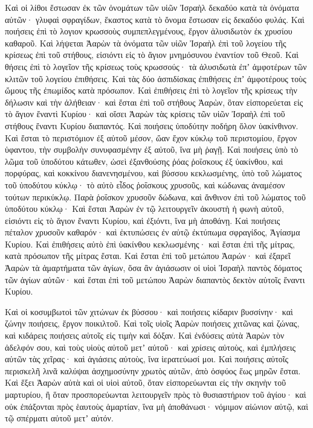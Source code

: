 {Καὶ οἱ λίθοι ἔστωσαν ἐκ τῶν ὀνομάτων τῶν υἱῶν Ἰσραὴλ δεκαδύο κατὰ τὰ ὀνόματα αὐτῶν· γλυφαὶ σφραγίδων, ἕκαστος κατὰ τὸ ὄνομα ἔστωσαν εἰς δεκαδύο φυλάς.
Καὶ ποιήσεις ἐπὶ τὸ λογιον κρωσσοὺς συμπεπλεγμένους, ἔργον ἁλυσιδωτὸν ἐκ χρυσίου καθαροῦ.
Καὶ λήψεται Ἀαρὼν τὰ ὀνόματα τῶν υἱῶν Ἰσραὴλ ἐπὶ τοῦ λογείου τῆς κρίσεως ἐπὶ τοῦ στήθους, εἰσιόντι εἰς τὸ ἅγιον μνημόσυνου ἐναντίον τοῦ Θεοῦ.
Καὶ θήσεις ἐπὶ τὸ λογεῖον τῆς κρίσεως τοὺς κρωσσούς· τὰ ἁλυσιδωτὰ ἐπʼ ἀμφοτέρων τῶν κλιτῶν τοῦ λογείου ἐπιθήσεις. Καὶ τὰς δύο ἀσπιδίσκας ἐπιθήσεις ἐπʼ ἀμφοτέρους τοὺς ὤμους τῆς ἐπωμίδος κατὰ πρόσωπον.
Καὶ ἐπιθήσεις ἐπὶ τὸ λογεῖον τῆς κρίσεως τὴν δήλωσιν καὶ τὴν ἀλήθειαν· καὶ ἔσται ἐπὶ τοῦ στήθους Ἀαρὼν, ὃταν εἰσπορεύεται εἰς τὸ ἅγιον ἔναντὶ Κυρίου· καὶ οἴσει Ἀαρὼν τὰς κρίσεις τῶν υἱῶν Ἰσραὴλ ἐπὶ τοῦ στήθους ἔναντι Κυρίου διαπαντός.
Καὶ ποιήσεις ὑποδύτην ποδήρη ὅλον ὑακίνθινον.
Καὶ ἔσται τὸ περιστόμιον ἐξ αὐτοῦ μέσον, ὤαν ἔχον κύκλῳ τοῦ περιστομίου, ἔργον ὑφαντου, τὴν συμβολὴν συνυφασμένην ἐξ αὐτοῦ, ἵνα μὴ ῥαγῇ.
Καὶ ποιήσεις ὑπὸ τὸ λῶμα τοῦ ὑποδύτου κάτωθεν, ὡσεὶ ἐξανθούσης ῥόας ῥοΐσκους ἐξ ὑακίνθου, καὶ πορφύρας, καὶ κοκκίνου διανενησμένου, καὶ βύσσου κεκλωσμένης, ὑπὸ τοῦ λώματος τοῦ ὑποδύτου κύκλῳ· τὸ αὐτὸ εἶδος ῥοΐσκους χρυσοῦς, καὶ κώδωνας ἀναμέσον τούτων περικύκλῳ.
Παρὰ ῥοΐσκον χρυσοῦν δώδωνα, καὶ ἄνθινον ἐπὶ τοῦ λώματος τοῦ ὑποδύτου κύκλῳ·
Καὶ ἔσται Ἀαρὼν ἐν τῷ λειτουργεῖν ἀκουστὴ ἡ φωνὴ αὐτοῦ, εἰσιόντι εἰς τὸ ἅγιον ἔναντι Κυρίου, καὶ ἐξιόντι, ἵνα μὴ ἀποθάνῃ.
Καὶ ποιήσεις πέταλον χρυσοῦν καθαρόν· καὶ ἐκτυπώσεις ἐν αὐτῷ ἐκτύπωμα σφραγίδος, Ἁγίασμα Κυρίου.
Καὶ ἐπιθήσεις αὐτὸ ἐπὶ ὑακίνθου κεκλωσμένης· καὶ ἔσται ἐπὶ τῆς μίτρας, κατὰ πρόσωπον τῆς μίτρας ἔσται.
Καὶ ἔσται ἐπὶ τοῦ μετώπου Ἀαρών· καὶ ἐξαρεῖ Ἀαρὼν τὰ ἁμαρτήματα τῶν ἁγίων, ὅσα ἂν ἁγιάσωσιν οἱ υἱοὶ Ἰσραὴλ παντὸς δόματος τῶν ἁγίων αὐτῶν· καὶ ἔσται ἐπὶ τοῦ μετώπου Ἀαρὼν διαπαντὸς δεκτὸν αὐτοῖς ἔναντι Κυρίου.
\par }{\PP {}Καὶ οἱ κοσυμβωτοὶ τῶν χιτώνων ἐκ βύσσου· καὶ ποιήσεις κίδαριν βυσσίνην· καὶ ζώνην ποιήσεις, ἔργον ποικιλτοῦ.
Καὶ τοῖς υἱοῖς Ἀαρὼν ποιήσεις χιτῶνας καὶ ζώνας, καὶ κιδάρεις ποιήσεις αὐτοῖς εἰς τιμὴν καὶ δόξαν.
Καὶ ἐνδύσεις αὐτὰ Ἀαρὼν τὸν ἀδελφόν σου, καὶ τοὺς υἱοὺς αὐτοῦ μετʼ αὐτοῦ· καὶ χρίσεις αὐτοὺς, καὶ ἐμπλήσεις αὐτῶν τὰς χεῖρας· καὶ ἁγιάσεις αὐτοὺς, ἵνα ἱερατεύωσί μοι.
Καὶ ποιήσεις αὐτοῖς περισκελῆ λινᾶ καλύψαι ἀσχημοσύνην χρωτὸς αὐτῶν, ἀπὸ ὀσφύος ἕως μηρῶν ἔσται.
Καὶ ἕξει Ἀαρὼν αὐτὰ καὶ οἱ υἱοὶ αὐτοῦ, ὅταν εἰσπορεύωνται εἰς τὴν σκηνὴν τοῦ μαρτυρίου, ἢ ὅταν προσπορεύωνται λειτουργεῖν πρὸς τὸ θυσιαστήριον τοῦ ἁγίου· καὶ οὐκ ἐπάξονται πρὸς ἑαυτοὺς ἁμαρτίαν, ἵνα μὴ ἀποθάνωσι· νόμιμον αἰώνιον αὐτῷ, καὶ τῷ σπέρματι αὐτοῦ μετʼ αὐτόν.

}

